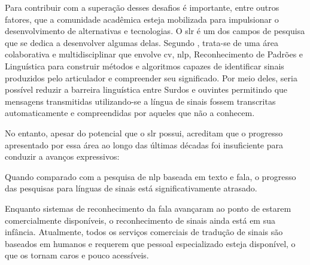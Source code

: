 Para contribuir com a superação desses desafios é importante, entre outros fatores, que a comunidade acadêmica esteja mobilizada para impulsionar o desenvolvimento de alternativas e tecnologias.
O \acrfull{slr} é um dos campos de pesquisa que se dedica a desenvolver algumas delas. Segundo , trata-se de uma área colaborativa e multidisciplinar que envolve \acrlong{cv}, \acrlong{nlp}, Reconhecimento de Padrões e Linguística para construir métodos e algoritmos capazes de identificar sinais produzidos pelo articulador e compreender seu significado.
Por meio deles, seria possível reduzir a barreira linguística entre Surdos e ouvintes permitindo que mensagens transmitidas utilizando-se a língua de sinais fossem transcritas automaticamente e compreendidas por aqueles que não a conhecem.



No entanto, apesar do potencial que o \acrshort{slr} possui,  acreditam que o progresso apresentado por essa área ao longo das últimas décadas foi insuficiente para conduzir a avanços expressivos:

\begin{citacao}
    Quando comparado com a pesquisa de \acrlong{nlp} baseada em texto e fala, o progresso das pesquisas para línguas de sinais está significativamente atrasado. \cite[tradução nossa]{selvaraj-2022-openhands,yin-2021-sl-in-nlp}
\end{citacao}

\begin{citacao}
    Enquanto sistemas de reconhecimento da fala avançaram ao ponto de estarem comercialmente disponíveis, o reconhecimento de sinais ainda está em sua infância.
    Atualmente, todos os serviços comerciais de tradução de sinais são baseados em humanos e requerem que pessoal especializado esteja disponível, o que os tornam caros e pouco acessíveis. \cite[tradução nossa]{cooper-2011-slr}
\end{citacao}


